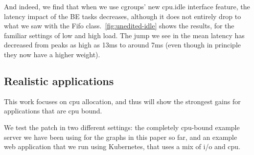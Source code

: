And indeed, we find that when we use cgroups' new cpu.idle interface feature,
the latency impact of the BE tasks decreases, although it does not entirely drop
to what we saw with the Fifo class.\ \autoref{fig:unedited-idle} shows the
results, for the familiar settings of low and high load. The jump we see in the
mean latency has decreased from peaks as high as 13ms to around 7ms (even though
in principle they now have a higher weight).

\subsection{Realistic applications}


This work focuses on cpu allocation, and thus will show the strongest gains for
applications that are cpu bound. 

We test the patch in two different settings: the completely cpu-bound example
server we have been using for the graphs in this paper so far, and an example
web application that we run using Kubernetes, that uses a mix of i/o and cpu.

